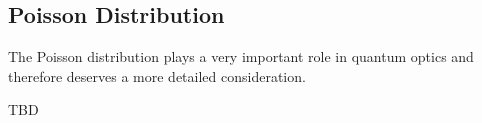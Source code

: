 \subsection{Poisson Distribution}

The Poisson distribution plays a very important role in quantum optics and
therefore deserves a more detailed consideration.

\begin{definition}
\end{definition}

TBD



